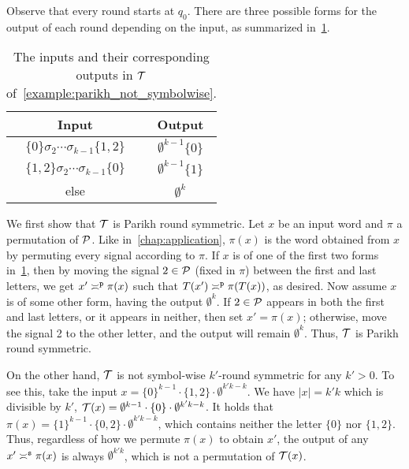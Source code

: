 \begin{example}
Observe that every round starts at $q_0$. There are three possible forms for the output of each round depending on the input, as summarized in~\cref{tab:example_parikh_not_symbolwise}.

\begin{table}[!htb]
    \centering
    \caption{The inputs and their corresponding outputs in $\cT$ of~\cref{example:parikh_not_symbolwise}.}
    \vspace{2mm}
    \def\arraystretch{1.3}
    \begin{tabular}{c|c}
        Input & Output \\
        \hline \hline
        $\{0\}\sigma_2\cdots \sigma_{k-1}\{1,2\}$ & $\emptyset^{k-1} \{0\}$ \\
        \hline
        $\{1,2\}\sigma_2\cdots \sigma_{k-1}\{0\}$ & $\emptyset^{k-1} \{1\}$ \\
        \hline
        else & $\emptyset^k$ \\
    \end{tabular}
    \label{tab:example_parikh_not_symbolwise}
\end{table}

We first show that $\cT$ is Parikh round symmetric. Let $x$ be an input word and $\pi$ a permutation of $\cP$. Like in~\cref{chap:application}, $\pi(x)$ is the word obtained from $x$ by permuting every signal according to $\pi$. If $x$ is of one of the first two forms in~\cref{tab:example_parikh_not_symbolwise}, then by moving the signal $2\in \cP$ (fixed in $\pi$) between the first and last letters, we get $x'\reqtype[]{p} \pi(x)$ such that $T(x')\reqtype[]{p} \pi(T(x))$, as desired. Now assume $x$ is of some other form, having the output $\emptyset^k$. If $2\in \cP$ appears in both the first and last letters, or it appears in neither, then set $x'=\pi(x)$; otherwise, move the signal 2 to the other letter, and the output will remain $\emptyset^k$. Thus, $\cT$ is Parikh round symmetric.

On the other hand, $\cT$ is not symbol-wise $k'$-round symmetric for any $k'>0$. To see this, take the input $x=\{0\}^{k-1}\cdot\{1,2\}\cdot\emptyset^{k'k-k}$. We have $|x|=k'k$ which is divisible by $k'$, $\cT(x)=\emptyset^{k-1}\cdot\{0\}\cdot\emptyset^{k'k-k}$. It holds that $\pi(x)=\{1\}^{k-1}\cdot\{0,2\}\cdot\emptyset^{k'k-k}$, which contains neither the letter $\{0\}$ nor $\{1,2\}$. Thus, regardless of how we permute $\pi(x)$ to obtain $x'$, the output of any $x'\reqtype[]{s}\pi(x)$ is always $\emptyset^{k'k}$, which is not a permutation of $\cT(x)$.


\end{example}
